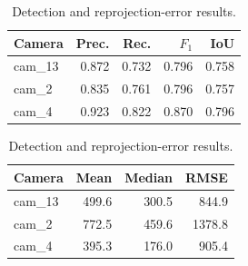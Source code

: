 \begin{table}[htbp]
\centering
\caption{Detection and reprojection-error results.}
\label{tab:results-detail}
\small
\begin{minipage}[t]{0.49\textwidth}
\centering
\begin{tabular}{lrrrr}
\toprule
Camera & Prec. & Rec. & $F_1$ & IoU \\
\midrule
cam\_13 & 0.872 & 0.732 & 0.796 & 0.758 \\
cam\_2  & 0.835 & 0.761 & 0.796 & 0.757 \\
cam\_4  & 0.923 & 0.822 & 0.870 & 0.796 \\
\bottomrule
\end{tabular}
\end{minipage}
\hfill
\begin{minipage}[t]{0.49\textwidth}
\centering
\begin{tabular}{lrrr}
\toprule
Camera & Mean & Median & RMSE \\
\midrule
cam\_13 & 499.6 & 300.5 &  844.9 \\
cam\_2  & 772.5 & 459.6 & 1378.8 \\
cam\_4  & 395.3 & 176.0 &  905.4 \\
\bottomrule
\end{tabular}
\end{minipage}
\end{table}